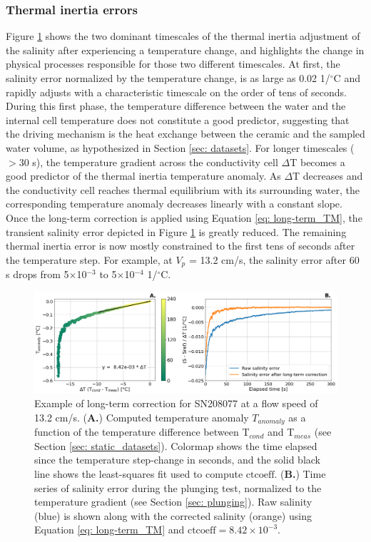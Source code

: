 \documentclass{ametsocV6.1}
\begin{document}
\subsubsection{Thermal inertia errors}
Figure \ref{fig: long-term_TM} shows the two dominant timescales of the thermal inertia adjustment of the salinity after experiencing a temperature change, and highlights the change in physical processes responsible for those two different timescales. 
At first, the salinity error normalized by the temperature change, is as large as 0.02 1/$^\circ$C and rapidly adjusts with a characteristic timescale on the order of tens of seconds. During this first phase, the temperature difference between the water and the internal cell temperature does not constitute a good predictor, suggesting that the driving mechanism is the heat exchange between the ceramic and the sampled water volume, as hypothesized in Section \ref{sec: datasets}.
For longer timescales ($>$30 s), the temperature gradient across the conductivity cell $\Delta$T becomes a good predictor of the thermal inertia temperature anomaly. As $\Delta$T decreases and the conductivity cell reaches thermal equilibrium with its surrounding water, the corresponding temperature anomaly decreases linearly with a constant slope.
Once the long-term correction is applied using Equation \ref{eq: long-term_TM}, the transient salinity error depicted in Figure \ref{fig: long-term_TM} is greatly reduced. The remaining thermal inertia error is now mostly constrained to the first tens of seconds after the temperature step. For example, at $V_p$ = 13.2 cm/s,  the salinity error after 60 s drops from 5$\times$10$^{-3}$ to 5$\times$10$^{-4}$ 1/$^\circ$C.

\begin{figure}[t]
	\centering
	\includegraphics[width=\linewidth]{Fig9_long_term_TM} \quad
	\caption{Example of long-term correction for SN208077 at a flow speed of 13.2 cm/s. (\textbf{A.}) Computed temperature anomaly $T_{anomaly}$ as a function of the temperature difference between T$_{cond}$ and T$_{meas}$ (see Section \ref{sec: static_datasets}). Colormap shows the time elapsed since the temperature step-change in seconds, and the solid black line shows the least-squares fit used to compute $\text{ctcoeff}$. (\textbf{B.}) Time series of salinity error during the plunging test, normalized to the temperature gradient (see Section \ref{sec: plunging}).  Raw salinity (blue) is shown along with the corrected salinity (orange) using Equation \ref{eq: long-term_TM} and $\text{ctcoeff} = 8.42\times10^{-3}$. }
	\label{fig: long-term_TM}
\end{figure}
\end{document}
